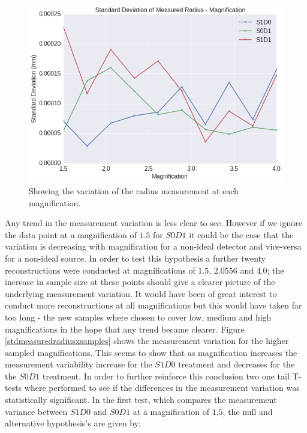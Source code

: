 \documentclass[
  twoside,
  11pt, a4paper,
  footinclude=true,
  headinclude=true,
  cleardoublepage=empty
]{scrbook}
\begin{document}
\begin{figure}[h!]
  \centering
    \includegraphics[width=\textwidth]{figures/output_14_0.png}
    \caption{Showing the variation of the radius measurement at each magnification.}
        \label{stdmeasuredradius}
\end{figure}

Any trend in the measurement variation is less clear to see. However if we ignore the data point at a magnification of $1.5$ for $S0D1$ it could be the case that the variation is decreasing with magnification for a non-ideal detector and vice-versa for a non-ideal source. In order to test this hypothesis a further twenty reconstructions were conducted at magnifications of $1.5$, $2.0556$ and $4.0$; the increase in sample size at these points should give a clearer picture of the underlying measurement variation. It would have been of great interest to conduct more reconstructions at all magnifications but this would have taken far too long - the new samples where chosen to cover low, medium and high magnifications in the hope that any trend became clearer. Figure \ref{stdmeasuredradiusxsamples} shows the measurement variation for the higher sampled magnifications. This seems to show that as magnification increases the measurement variability increase for the $S1D0$ treatment and decreases for the the $S0D1$ treatment. In order to further reinforce this conclusion two one tail T-tests where performed to see if the differences in the measurement variation was statistically significant. In the first test, which compares the measurement variance between $S1D0$ and  $S0D1$ at a magnification of $1.5$, the null and alternative hypothesis's are given by;
\end{document}
